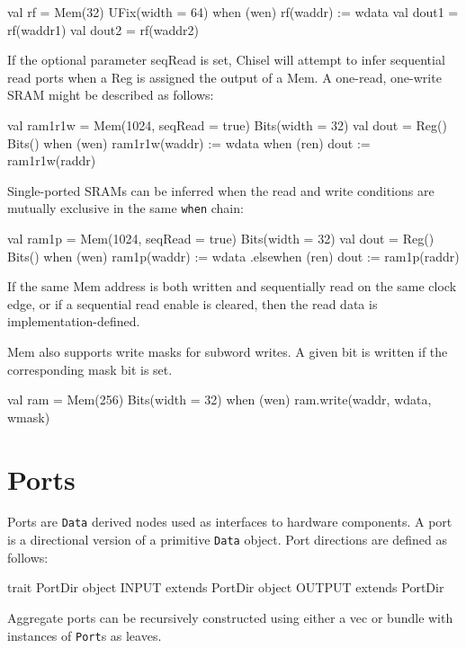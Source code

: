 \documentclass[10pt,twocolumn]{article}
\def\code#1{{\small\tt #1}}
\begin{document}
\begin{scala}
val rf = Mem(32) { UFix(width = 64) }
when (wen) { rf(waddr) := wdata }
val dout1 = rf(waddr1)
val dout2 = rf(waddr2)
\end{scala}

If the optional parameter seqRead is set, Chisel will attempt to infer
sequential read ports when a Reg is assigned the output of a Mem.  A one-read,
one-write SRAM might be described as follows:

\begin{scala}
val ram1r1w = Mem(1024, seqRead = true) { Bits(width = 32) }
val dout = Reg() { Bits() }
when (wen) { ram1r1w(waddr) := wdata }
when (ren) { dout := ram1r1w(raddr) }
\end{scala}

Single-ported SRAMs can be inferred when the read and write conditions are
mutually exclusive in the same \code{when} chain:

\begin{scala}
val ram1p = Mem(1024, seqRead = true) { Bits(width = 32) }
val dout = Reg() { Bits() }
when (wen) { ram1p(waddr) := wdata }
.elsewhen (ren) { dout := ram1p(raddr) }
\end{scala}

If the same Mem address is both written and sequentially read on the same clock
edge, or if a sequential read enable is cleared, then the read data is
implementation-defined.

Mem also supports write masks for subword writes.  A given bit is written if
the corresponding mask bit is set.

\begin{scala}
val ram = Mem(256) { Bits(width = 32) }
when (wen) { ram.write(waddr, wdata, wmask) }
\end{scala}

\section{Ports}
\label{sec:ports}

Ports are \code{Data} derived nodes used as interfaces to hardware
components.   A port is a directional version of a primitive
\code{Data} object.  Port directions are defined as follows:

\begin{scala}
trait PortDir
object INPUT  extends PortDir
object OUTPUT extends PortDir
\end{scala}

\noindent
Aggregate ports can be recursively constructed using either a vec or
bundle with instances of \code{Port}s as leaves.  
\end{document}
